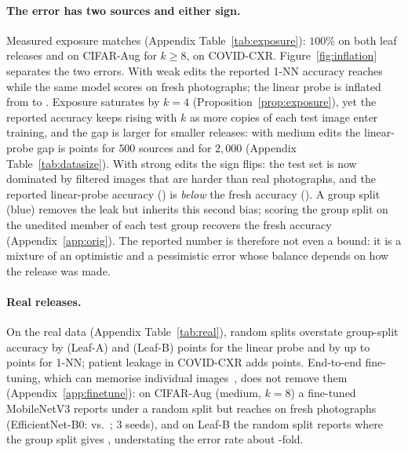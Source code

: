 \paragraph{The error has two sources and either sign.}
Measured exposure matches  (Appendix Table~\ref{tab:exposure}): $100\%$ on both leaf releases and on CIFAR-Aug for $k\ge8$, \numCovidQ{} on COVID-CXR. Figure~\ref{fig:inflation} separates the two errors. With weak edits the reported 1-NN accuracy reaches \numWeakKnnRep{} while the same model scores \numWeakKnnFresh{} on fresh photographs; the linear probe is inflated from \numWeakLpFresh{} to \numWeakLpRep{}. Exposure saturates by $k=4$ (Proposition~\ref{prop:exposure}), yet the reported accuracy keeps rising with $k$ as more copies of each test image enter training, and the gap is larger for smaller releases: with medium edits the linear-probe gap is \numSizeGapSmall{} points for $500$ sources and \numSizeGapLarge{} for $2{,}000$ (Appendix Table~\ref{tab:datasize}). With strong edits the sign flips: the test set is now dominated by filtered images that are harder than real photographs, and the reported linear-probe accuracy (\numStrongLpRep{}) is \emph{below} the fresh accuracy (\numStrongLpFresh{}). A group split (blue) removes the leak but inherits this second bias; scoring the group split on the unedited member of each test group recovers the fresh accuracy (Appendix~\ref{app:orig}). The reported number is therefore not even a bound: it is a mixture of an optimistic and a pessimistic error whose balance depends on how the release was made.

\paragraph{Real releases.}
On the real data (Appendix Table~\ref{tab:real}), random splits overstate group-split accuracy by \numLeafALpGap{} (Leaf-A) and \numLeafBLpGap{} (Leaf-B) points for the linear probe and by up to \numLeafBKnnGap{} points for 1-NN; patient leakage in COVID-CXR adds \numCovidLpGap{} points. End-to-end fine-tuning, which can memorise individual images~\citep{zhang2017rethinking,feldman2020memorization}, does not remove them (Appendix~\ref{app:finetune}): on CIFAR-Aug (medium, $k=8$) a fine-tuned MobileNetV3 reports \numFtCMedRandom{} under a random split but reaches \numFtCMedRandomFresh{} on fresh photographs (EfficientNet-B0: \numFtCMedEffRandom{} vs.\ \numFtCMedEffRandomFresh{}; 3 seeds), and on Leaf-B the random split reports \numFtLeafBRandom{} where the group split gives \numFtLeafBGroup{}, understating the error rate about \numFtLeafBErrRatio{}-fold.


